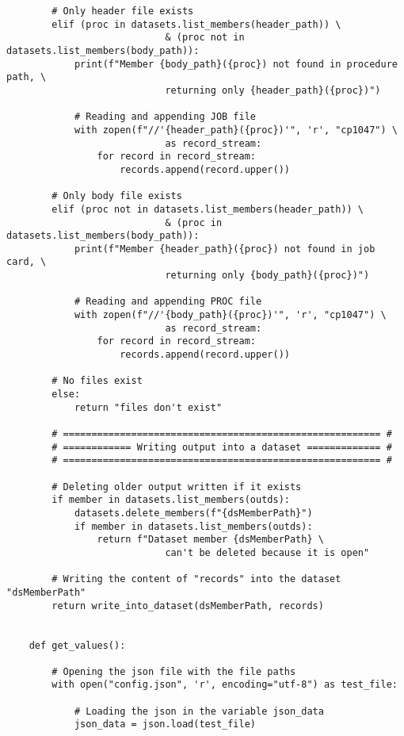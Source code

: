 \begin{lstlisting}
        # Only header file exists
        elif (proc in datasets.list_members(header_path)) \
                            & (proc not in datasets.list_members(body_path)):
            print(f"Member {body_path}({proc}) not found in procedure path, \
                            returning only {header_path}({proc})")
            
            # Reading and appending JOB file
            with zopen(f"//'{header_path}({proc})'", 'r', "cp1047") \
                            as record_stream:
                for record in record_stream:
                    records.append(record.upper())
        
        # Only body file exists
        elif (proc not in datasets.list_members(header_path)) \
                            & (proc in datasets.list_members(body_path)):
            print(f"Member {header_path}({proc}) not found in job card, \
                            returning only {body_path}({proc})")
            
            # Reading and appending PROC file
            with zopen(f"//'{body_path}({proc})'", 'r', "cp1047") \
                            as record_stream:
                for record in record_stream:
                    records.append(record.upper())
                    
        # No files exist 
        else:
            return "files don't exist"
        
        # ======================================================== #
        # ============ Writing output into a dataset ============= #
        # ======================================================== #
        
        # Deleting older output written if it exists
        if member in datasets.list_members(outds):
            datasets.delete_members(f"{dsMemberPath}")
            if member in datasets.list_members(outds):
                return f"Dataset member {dsMemberPath} \
                            can't be deleted because it is open"
                
        # Writing the content of "records" into the dataset "dsMemberPath"   
        return write_into_dataset(dsMemberPath, records)
    
    
    def get_values():
    
        # Opening the json file with the file paths 
        with open("config.json", 'r', encoding="utf-8") as test_file:
        
            # Loading the json in the variable json_data
            json_data = json.load(test_file)
            

\end{lstlisting}
